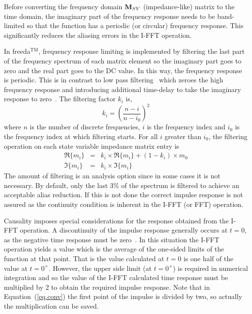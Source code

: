 Before converting the frequency domain ${\bf M}_{SV}$ (impedance-like)
matrix to the time domain, the imaginary part of the frequency
response needs to be band-limited so that the function has a periodic
(or circular) frequency response. This significantly reduces the
aliasing errors in the I-FFT operation.

In freeda$^{\mathrm{TM}}$, frequency response limiting is implemented by filtering
the last part of the frequency spectrum of each matrix element so the
imaginary part goes to zero and the real part goes to the DC value. In
this way, the frequency response is periodic. This is in contrast to
low pass filtering~\cite{basel:paper} which zeroes the high frequency
response and introducing additional time-delay to take the imaginary
response to zero~\cite{Brazil:New}. The filtering factor $k_i$ is,
\begin{equation} 
  k_i = \left(\frac{n-i}{n-i_0}\right)^2
\end{equation}
where $n$ is the number of discrete frequencies, $i$ is the frequency
index and $i_0$ is the frequency index at which filtering starts.
For all $i$ greater than $i_0$, the filtering operation on each state
variable impedance matrix entry is
\begin{eqnarray}
  \Re\{m_i\} &=& k_i \times \Re\{m_i\} + (1 - k_i) \times m_0 \\
  \Im\{m_i\} &=& k_i \times \Im\{m_i\}
\end{eqnarray}
The amount of filtering is an analysis option since in some cases it
is not necessary. By default, only the last 3\% of the spectrum is
filtered to achieve an acceptable alias reduction.  If this is not
done the correct impulse response is not assured as the continuity
condition is inherent in the I-FFT (or FFT) operation.

Causality imposes special considerations for the response obtained
from the I-FFT operation. A discontinuity of the impulse response
generally occurs at $t=0$, as the negative time response must be
zero~\cite{aplac}. In this situation the I-FFT operation yields a
value which is the average of the one-sided limits of the function at
that point. That is the value calculated at $t=0$ is one half of the
value at $t=0^+$. However, the upper side limit (at $t=0^+$) is
required in numerical integration and so the value of the I-FFT
calculated time response must be multiplied by 2 to obtain the
required impulse response. Note that in Equation~(\ref{eq.conv}) the
first point of the impulse is divided by two, so actually the
multiplication can be saved.

